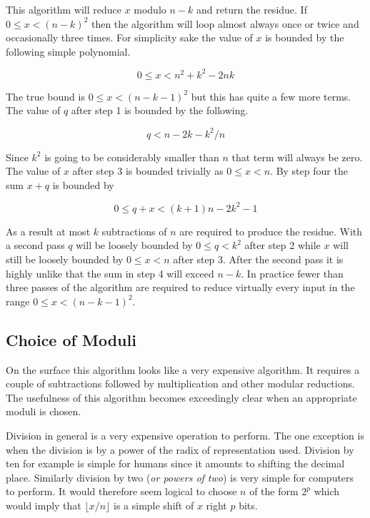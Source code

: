 \documentclass[b5paper]{book}
\begin{document}
This algorithm will reduce $x$ modulo $n - k$ and return the residue.  If $0 \le x < (n - k)^2$ then the algorithm will loop almost always
once or twice and occasionally three times.  For simplicity sake the value of $x$ is bounded by the following simple polynomial.

\begin{equation} 
0 \le x < n^2 + k^2 - 2nk
\end{equation}

The true bound is  $0 \le x < (n - k - 1)^2$ but this has quite a few more terms.  The value of $q$ after step 1 is bounded by the following.

\begin{equation}
q < n - 2k - k^2/n
\end{equation}

Since $k^2$ is going to be considerably smaller than $n$ that term will always be zero.  The value of $x$ after step 3 is bounded trivially as
$0 \le x < n$.  By step four the sum $x + q$ is bounded by 

\begin{equation}
0 \le q + x < (k + 1)n - 2k^2 - 1
\end{equation}

As a result at most $k$ subtractions of $n$ are required to produce the residue.  With a second pass $q$ will be loosely bounded by $0 \le q < k^2$
after step 2 while $x$ will still be loosely bounded by $0 \le x < n$ after step 3.  After the second pass it is highly unlike that the
sum in step 4 will exceed $n - k$.  In practice fewer than three passes of the algorithm are required to reduce virtually every input in the 
range $0 \le x < (n - k - 1)^2$.  

\subsection{Choice of Moduli}
On the surface this algorithm looks like a very expensive algorithm.  It requires a couple of subtractions followed by multiplication and other
modular reductions.  The usefulness of this algorithm becomes exceedingly clear when an appropriate moduli is chosen.

Division in general is a very expensive operation to perform.  The one exception is when the division is by a power of the radix of representation used.  
Division by ten for example is simple for humans since it amounts to shifting the decimal place.  Similarly division by two 
(\textit{or powers of two}) is very simple for computers to perform.  It would therefore seem logical to choose $n$ of the form $2^p$ 
which would imply that $\lfloor x / n \rfloor$ is a simple shift of $x$ right $p$ bits.  
\end{document}
